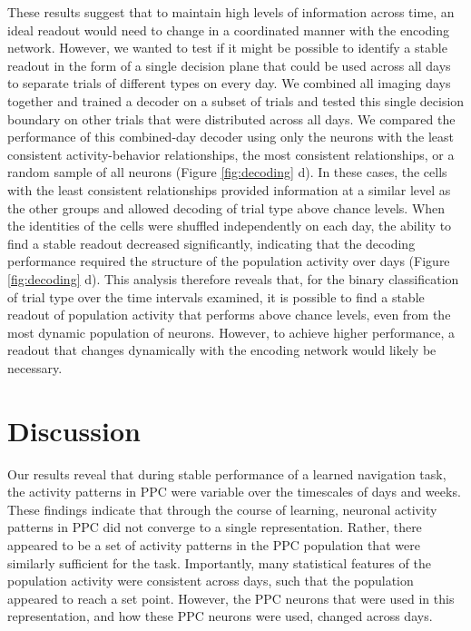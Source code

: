 These results suggest that to maintain high levels of information across time, an ideal readout would need to change in a coordinated manner with the encoding network. However, we wanted to test if it might be possible to identify a stable readout in the form of a single decision plane that could be used across all days to separate trials of different types on every day. We combined all imaging days together and trained a decoder on a subset of trials and tested this single decision boundary on other trials that were distributed across all days. We compared the performance of this combined-day decoder using only the neurons with the least consistent activity-behavior relationships, the most consistent relationships, or a random sample of all neurons (Figure \ref{fig:decoding} d). In these cases, the cells with the least consistent relationships provided information at a similar level as the other groups and allowed decoding of trial type above chance levels. When the identities of the cells were shuffled independently on each day, the ability to find a stable readout decreased significantly, indicating that the decoding performance required the structure of the population activity over days (Figure \ref{fig:decoding} d). This analysis therefore reveals that, for the binary classification of trial type over the time intervals examined, it is possible to find a stable readout of population activity that performs above chance levels, even from the most dynamic population of neurons. However, to achieve higher performance, a readout that changes dynamically with the encoding network would likely be necessary. 

\section{Discussion}
Our results reveal that during stable performance of a learned navigation task, the activity patterns in PPC were variable over the timescales of days and weeks. These findings indicate that through the course of learning, neuronal activity patterns in PPC did not converge to a single representation. Rather, there appeared to be a set of activity patterns in the PPC population that were similarly sufficient for the task. Importantly, many statistical features of the population activity were consistent across days, such that the population appeared to reach a set point. However, the PPC neurons that were used in this representation, and how these PPC neurons were used, changed across days.

\bigskip

